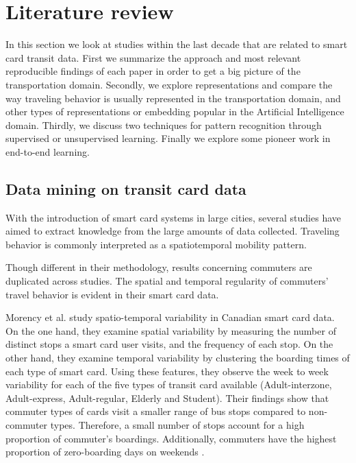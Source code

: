 \documentclass{article}
\begin{document}
\newpage
\section{Literature review}
In this section we look at studies within the last decade that are related to smart card transit data. First we summarize the approach and most relevant reproducible findings of each paper in order to get a big picture of the transportation domain. Secondly, we explore representations and compare the way traveling behavior is usually represented in the transportation domain, and other types of representations or embedding popular in the Artificial Intelligence domain. Thirdly, we discuss two techniques for pattern recognition through supervised or unsupervised learning. Finally we explore some pioneer work in end-to-end learning. 

\subsection{Data mining on transit card data}
With the introduction of smart card systems in large cities, several studies have aimed to extract knowledge from the large amounts of data collected. Traveling behavior is commonly interpreted as a spatiotemporal mobility pattern.

Though different in their methodology, results concerning commuters are duplicated across studies. The spatial and temporal regularity of commuters' travel behavior is evident in their smart card data.


Morency et al. study spatio-temporal variability in Canadian smart card data. On the one hand, they examine spatial variability by measuring the number of distinct stops a smart card user visits, and the frequency of each stop. On the other hand, they examine temporal variability by clustering the boarding times of each type of smart card. Using these features, they observe the week to week variability for each of the five types of transit card available (Adult-interzone, Adult-express, Adult-regular, Elderly and Student). Their findings show that commuter types of cards visit a smaller range of bus stops compared to non-commuter types. Therefore, a small number of stops account for a high proportion of commuter's boardings. Additionally, commuters have the highest proportion of zero-boarding days on weekends \cite{morency2007measuring}.
\end{document}
